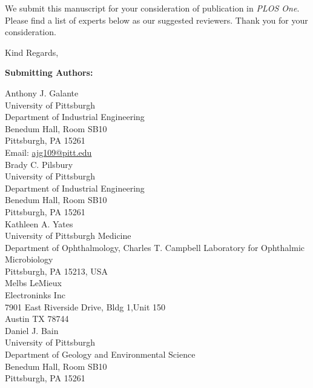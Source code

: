 \documentclass[11pt]{letter}
\begin{document}
\begin{letter}{}
We submit this manuscript for your consideration of publication in %
\textit{PLOS One}.
Please find a list of experts below as our suggested reviewers.
Thank you for your consideration.

\closing{Kind Regards,}


\end{letter}

\newpage

\textbf{Submitting Authors:}

Anthony J. Galante\\
University of Pittsburgh \\
Department of Industrial Engineering \\
Benedum Hall, Room SB10 \\
Pittsburgh, PA 15261\\
Email:  \href{mailto:ajg109@pitt.edu}{ajg109@pitt.edu}\\

Brady C. Pilsbury \\
University of Pittsburgh \\
Department of Industrial Engineering \\
Benedum Hall, Room SB10 \\
Pittsburgh, PA 15261\\

Kathleen A. Yates\\
University of Pittsburgh Medicine\\
Department of Ophthalmology, Charles T. Campbell Laboratory for Ophthalmic Microbiology\\
Pittsburgh, PA 15213, USA\\

Melbs LeMieux \\
Electroninks Inc \\ 
7901 East Riverside Drive, Bldg 1,Unit 150\\
Austin TX  78744 \\

Daniel J. Bain \\
University of Pittsburgh \\
Department of Geology and Environmental Science\\
Benedum Hall, Room SB10 \\
Pittsburgh, PA 15261\\
\end{document}
